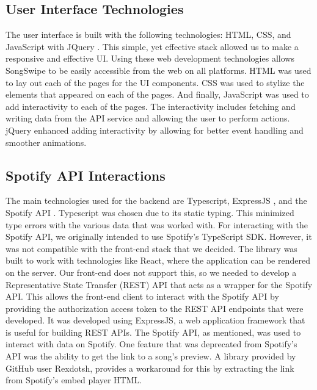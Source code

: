 \documentclass{article}
\begin{document}
\subsection{User Interface Technologies}
\quad The user interface is built with the following technologies: HTML, CSS, and JavaScript with JQuery \cite{jquery}. This simple, yet effective stack allowed us to make a responsive and effective UI. Using these web development technologies allows SongSwipe to be easily accessible from the web on all platforms. HTML was used to lay out each of the pages for the UI components. CSS was used to stylize the elements that appeared on each of the pages. And finally, JavaScript was used to add interactivity to each of the pages. The interactivity includes fetching and writing data from the API service and allowing the user to perform actions. jQuery enhanced adding interactivity by allowing for better event handling and smoother animations. \\ 

\subsection{Spotify API Interactions}
\quad The main technologies used for the backend are Typescript, ExpressJS \cite{expressjs}, and the Spotify API \cite{Spotify_docs}. Typescript was chosen due to its static typing. This minimized type errors with the various data that was worked with. For interacting with the Spotify API, we originally intended to use Spotify's TypeScript SDK. However, it was not compatible with the front-end stack that we decided. The library was built to work with technologies like React, where the application can be rendered on the server. Our front-end does not support this, so we needed to develop a Representative State Transfer (REST) API that acts as a wrapper for the Spotify API. This allows the front-end client to interact with the Spotify API by providing the authorization access token to the REST API endpoints that were developed. It was developed using ExpressJS, a web application framework that is useful for building REST APIs. The Spotify API, as mentioned, was used to interact with data on Spotify. One feature that was deprecated from Spotify's API was the ability to get the link to a song's preview. A library \cite{Spotify_preview_url} provided by GitHub user Rexdotsh, provides a workaround for this by extracting the link from Spotify's embed player HTML.
\end{document}
